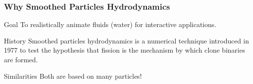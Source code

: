 \documentclass[aspectratio=169]{beamer}
\begin{document}
\begin{frame}
\frametitle{Why Smoothed Particles Hydrodynamics}
\begin{block}{Goal}
To realistically animate fluids (water) for interactive applications.
\end{block}
\begin{block}{History}
Smoothed particles hydrodynamics is a numerical technique introduced in 1977 to test the hypothesis that fission is the mechanism by which clone binaries are formed.~\cite{lucy1977numerical}
\end{block}
\begin{block}{Similarities}
Both are based on many particles!
\end{block}
\end{frame}
\end{document}
